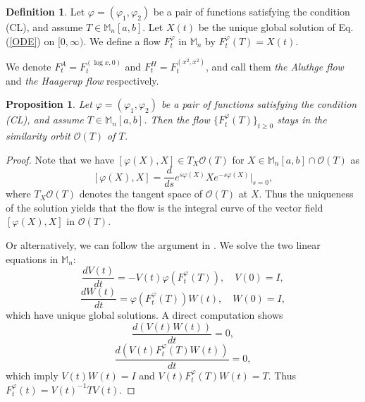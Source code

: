 \documentclass[12pt]{article}
\newtheorem{proposition}[theorem]{Proposition}
\theoremstyle{definition}
\newtheorem{definition}[theorem]{Definition}
\numberwithin{equation}{section}
\newcommand{\M}{\mathbb{M}}
\newcommand{\cO}{\mathcal{O}} \newcommand{\cP}{\mathcal{P}}
\begin{document}
\begin{definition}
Let $\varphi=(\varphi_1,\varphi_2)$ be a pair of functions satisfying the condition (CL), 
and assume $T\in \M_n[a,b]$. 
Let $X(t)$ be the unique global solution of Eq.(\ref{ODE}) on $[0,\infty)$.  
We define a flow $F^\varphi_t$ in $\M_n$ by $F^\varphi_t(T)=X(t)$. 

We denote $F^A_t=F^{(\log x,0)}_t$ and $F^H_t=F^{(x^2,x^2)}_t$, and call them 
\textit{the Aluthge flow} and \textit{the Haagerup flow} respectively. 
\end{definition}

\begin{proposition}\label{orbit}
Let $\varphi=(\varphi_1,\varphi_2)$ be a pair of functions satisfying the condition (CL), 
and assume $T\in \M_n[a,b]$. 
Then the flow $\{F^\varphi_t(T)\}_{t\geq 0}$ stays in the similarity orbit $\cO(T)$ of $T$. 
\end{proposition}

\begin{proof} Note that we have $[\varphi(X),X]\in T_X\cO(T)$ for $X\in \M_n[a,b]\cap \cO(T)$ as 
\[[\varphi(X),X]=\frac{d}{ds}e^{s\varphi(X)}Xe^{-s\varphi(X)}|_{s=0},\] 
where $T_X\cO(T)$ denotes the tangent space of $\cO(T)$ at $X$. 
Thus the uniqueness of the solution yields that the flow is the integral curve of 
the vector field $[\varphi(X),X]$ in $\cO(T)$. 

Or alternatively, we can follow the argument in \cite[Section 2]{HS2009}. 
We solve the two linear equations in $\M_n$: 
\begin{equation*}
\frac{dV(t)}{dt}=-V(t)\varphi(F^\varphi_t(T)),\quad V(0)=I,
\end{equation*} 
\begin{equation*}
\frac{dW(t)}{dt}=\varphi(F^\varphi_t(T))W(t),\quad W(0)=I, 
\end{equation*}
which have unique global solutions. 
A direct computation shows 
\[\frac{d(V(t)W(t))}{dt}=0,\]
\[\frac{d(V(t)F^\varphi_t(T)W(t))}{dt}=0,\]
which imply $V(t)W(t)=I$ and $V(t)F^\varphi_t(T)W(t)=T$. 
Thus $F^\varphi_t(t)=V(t)^{-1}TV(t)$. 
\end{proof}
\end{document}
